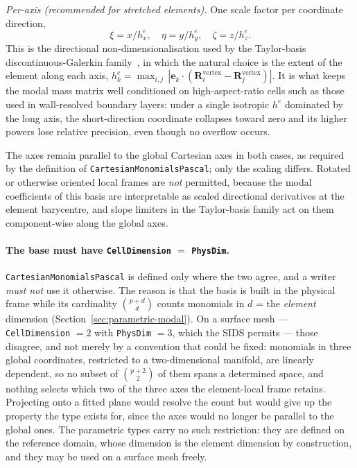 \documentclass[11pt,letterpaper]{article}
\newif\ifvfourdraft
\newcommand{\vfourmark}{\ifvfourdraft\textcolor{v4violet}{\textbf{[v4]}}\ \fi}
\begin{document}
\smallskip\noindent\textit{Per-axis (recommended for stretched elements).}  One scale
factor per coordinate direction,
\begin{equation}
  \xi = x/h^e_x, \quad \eta = y/h^e_y, \quad \zeta = z/h^e_z .
\end{equation}
This is the directional non-dimensionalisation used by the Taylor-basis
discontinuous-Galerkin family~\cite{LuoBaumLohner08,Kuzmin20}, in which the natural
choice is the extent of the element along each axis,
$h^e_k = \max_{i,j}\,|\mathbf{e}_k\cdot(\mathbf{R}_i^\mathrm{vertex}
- \mathbf{R}_j^\mathrm{vertex})|$.
It is what keeps the modal mass matrix well conditioned on high-aspect-ratio cells such
as those used in wall-resolved boundary layers: under a single isotropic $h^e$ dominated
by the long axis, the short-direction coordinate collapses toward zero and its higher
powers lose relative precision, even though no overflow occurs.

\smallskip\noindent The axes remain parallel to the global Cartesian axes in both cases,
as required by the definition of \texttt{CartesianMonomialsPascal}; only the scaling
differs.  Rotated or otherwise oriented local frames are \emph{not} permitted, because
the modal coefficients of this basis are interpretable as scaled directional derivatives
at the element barycentre, and slope limiters in the Taylor-basis family act on them
component-wise along the global axes.

\paragraph{\vfourmark The base must have \texttt{CellDimension} $=$ \texttt{PhysDim}.}
\texttt{CartesianMonomialsPascal} is defined only where the two agree, and a
writer \emph{must not} use it otherwise.  The reason is that the basis is built
in the physical frame while its cardinality $\binom{p+d}{d}$ counts monomials in
$d$ = the \emph{element} dimension (Section~\ref{sec:parametric-modal}).  On a
surface mesh --- \texttt{CellDimension} $=2$ with \texttt{PhysDim} $=3$, which
the SIDS permits --- those disagree, and not merely by a convention that could be
fixed: monomials in three global coordinates, restricted to a two-dimensional
manifold, are linearly dependent, so no subset of $\binom{p+2}{2}$ of them spans
a determined space, and nothing selects which two of the three axes the
element-local frame retains.  Projecting onto a fitted plane would resolve the
count but would give up the property the type exists for, since the axes would no
longer be parallel to the global ones.  The parametric types carry no such
restriction: they are defined on the reference domain, whose dimension is the
element dimension by construction, and they may be used on a surface mesh
freely.
\end{document}
